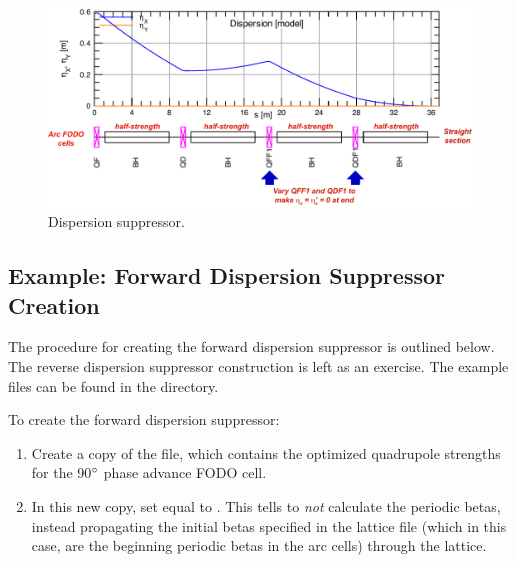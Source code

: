 \documentclass{hitec}     %
\begin{document}
{\begin{figure}[!h]
  \includegraphics[width=0.95\columnwidth]{figures/dispsup.pdf}
    \caption{Dispersion suppressor.}
    \label{f:dispsup}
\end{figure}

\subsection{Example: Forward Dispersion Suppressor Creation}

The procedure for creating the forward dispersion suppressor is outlined below. 
The reverse dispersion suppressor construction is left as an exercise. 
The example files can be found in the  directory.

To create the forward dispersion suppressor:
\begin{enumerate}[leftmargin=*]
\item Create a copy of the  file, which contains the optimized quadrupole strengths for the 90$\degree$ phase advance FODO cell.
%
\item In this new copy, set  equal to . This tells \bmad to \textit{not} calculate the periodic betas, instead propagating the initial betas specified in the lattice file (which in this case, are the beginning periodic betas in the arc cells) through the lattice.


\end{enumerate}}
\end{document}
